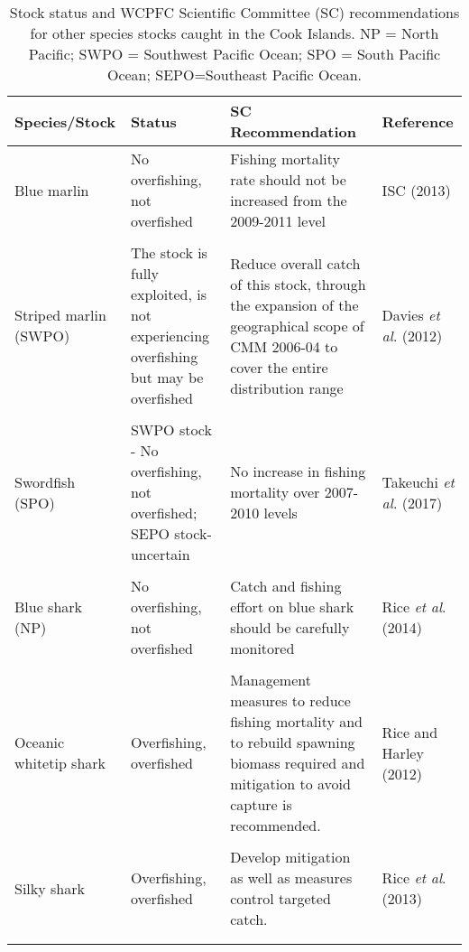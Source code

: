 \begingroup\fontsize{9pt}{11pt}\selectfont
\begin{longtable}{p{2.5cm}p{4cm}p{5.5cm}p{2cm}}
\caption{Stock status and WCPFC Scientific Committee (SC) recommendations for other species stocks caught in the Cook Islands. NP = North Pacific; SWPO = Southwest Pacific Ocean; SPO = South Pacific Ocean; SEPO=Southeast Pacific Ocean.} \\ 
  \hline
\hline
Species/Stock & Status & SC Recommendation & Reference \\ 
  \hline
Blue marlin & No overfishing, not overfished & Fishing mortality rate should not be increased from the 2009-2011 level & ISC (2013) \\ \\
   Striped marlin (SWPO) & The stock is fully exploited, is not experiencing overfishing but may be overfished & Reduce overall catch of this stock, through the expansion of the geographical scope of CMM 2006-04 to cover the entire distribution range & Davies {\itshape et al}. (2012) \\ \\
  Swordfish (SPO) & SWPO stock - No overfishing, not overfished; SEPO stock- uncertain & No increase in fishing mortality over 2007-2010 levels & Takeuchi {\itshape et al}. (2017) \\ \\
   Blue shark (NP) & No overfishing, not overfished & Catch and fishing effort on blue shark should be carefully monitored & Rice {\itshape et al}. (2014) \\ \\
  Oceanic whitetip shark & Overfishing, overfished & Management measures to reduce fishing mortality and to rebuild spawning biomass required and mitigation to avoid capture is recommended. & Rice and Harley (2012) \\ \\
   Silky shark & Overfishing, overfished & Develop mitigation as well as measures control targeted catch. & Rice {\itshape et al}. (2013) \\ \\
   \hline
\hline
\label{tab3}
\end{longtable}
\endgroup
